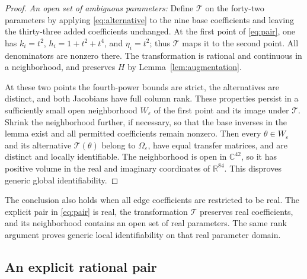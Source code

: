 \documentclass[letterpaper,10pt,conference]{ieeeconf}
\begin{document}
\begin{proof}
\emph{An open set of ambiguous parameters:}
Define \(\mathcal T\) on the forty-two parameters by applying
\eqref{eq:alternative} to the nine base coefficients and leaving the
thirty-three added coefficients unchanged.
At the first point of \eqref{eq:pair}, one has \(k_i=t^2\),
\(h_i=1+t^2+t^4\), and \(\eta_i=t^2\); thus \(\mathcal T\) maps it to
the second point. All denominators are nonzero there.
The transformation is rational and continuous in a neighborhood, and
preserves \(H\) by Lemma~\ref{lem:augmentation}.

At these two points the fourth-power bounds are strict, the alternatives
are distinct, and both Jacobians have full column rank. These
properties persist in a sufficiently small open neighborhood
\(W_\varepsilon\) of the first point and its image under \(\mathcal T\).
Shrink the neighborhood further, if necessary, so that the base
inverses in the lemma exist and all permitted coefficients remain
nonzero. Then every
\(\theta\in W_\varepsilon\) and its alternative
\(\mathcal T(\theta)\) belong to \(\Omega_\varepsilon\), have equal
transfer matrices, and are distinct and locally identifiable.
The neighborhood is open in \(\mathbb C^{42}\), so it has positive
volume in the real and imaginary coordinates of \(\mathbb R^{84}\).
This disproves generic global identifiability.
\end{proof}

The conclusion also holds when all edge coefficients are restricted to
be real. The explicit pair in \eqref{eq:pair} is real, the transformation
\(\mathcal T\) preserves real coefficients, and its neighborhood contains
an open set of real parameters. The same rank argument proves generic
local identifiability on that real parameter domain.

\subsection{An explicit rational pair}
\end{document}
